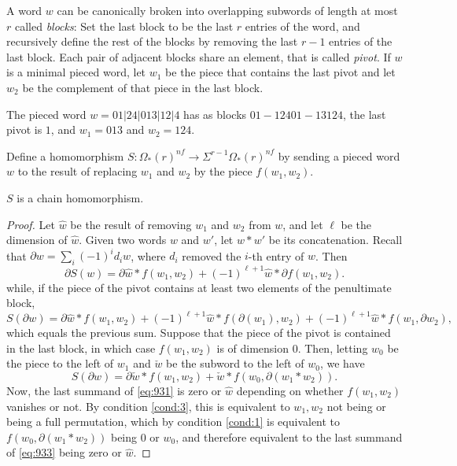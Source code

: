 	A word $w$ can be canonically broken into overlapping subwords of length at most $r$ called \emph{blocks}: Set the last block to be the last $r$ entries of the word, and recursively define the rest of the blocks by removing the last $r-1$ entries of the last block. Each pair of adjacent blocks share an element, that is called \emph{pivot}. If $w$ is a minimal pieced word, let $w_1$ be the piece that contains the last pivot and let $w_2$ be the complement of that piece in the last block.
	\begin{example} The pieced word $w=01|24|013|12|4$ has as blocks $01-12401-13124$, the last pivot is $1$, and $w_1 = 013$ and $w_2 = 124$.
	\end{example}
	\begin{definition} Define a homomorphism $S\colon \Omega_*(r)^{nf}\to \Sigma^{r-1}\Omega_*(r)^{nf}$ by sending a pieced word $w$ to the result of replacing $w_1$ and $w_2$ by the piece $f(w_1,w_2)$. %
	\end{definition}
	\begin{lemma} $S$ is a chain homomorphism.
	\end{lemma}
	\begin{proof}
		Let $\hat{w}$ be the result of removing $w_1$ and $w_2$ from $w$, and let $\ell$ be the dimension of $\hat{w}$. Given two words $w$ and $w'$, let $w*w'$ be its concatenation. Recall that $\partial w = \sum_{i} (-1)^{i}d_iw$, where $d_i$ removed the $i$-th entry of $w$. Then
		\begin{equation}\label{eq:931}
			\partial S(w) = \partial \hat{w}*f(w_1,w_2) + (-1)^{\ell+1}\hat{w}*\partial f(w_1,w_2).
		\end{equation}
		while, if the piece of the pivot contains at least two elements of the penultimate block,
		\[S(\partial w) = \partial \hat{w}*f(w_1,w_2) + (-1)^{\ell+1}\hat{w}*f(\partial(w_1),w_2) + (-1)^{\ell+1}\hat{w}*f(w_1,\partial w_2),\]
		which equals the previous sum. Suppose that the piece of the pivot is contained in the last block, in which case $f(w_1,w_2)$ is of dimension $0$. Then, letting $w_0$ be the piece to the left of $w_1$ and $\check{w}$ be the subword to the left of $w_0$, we have
		\begin{equation}\label{eq:933}
			S(\partial w) = \partial \check{w}*f(w_1,w_2) + \check{w}*f(w_0,\partial(w_1*w_2)).
		\end{equation}
		Now, the last summand of \eqref{eq:931} is zero or $\hat{w}$ depending on whether $f(w_1,w_2)$ vanishes or not. By condition \eqref{cond:3}, this is equivalent to $w_1,w_2$ not being or being a full permutation, which by condition \eqref{cond:1} is equivalent to $f(w_0,\partial(w_1*w_2))$ being $0$ or $w_0$, and therefore equivalent to the last summand of \eqref{eq:933} being zero or $\hat{w}$.
	\end{proof}

